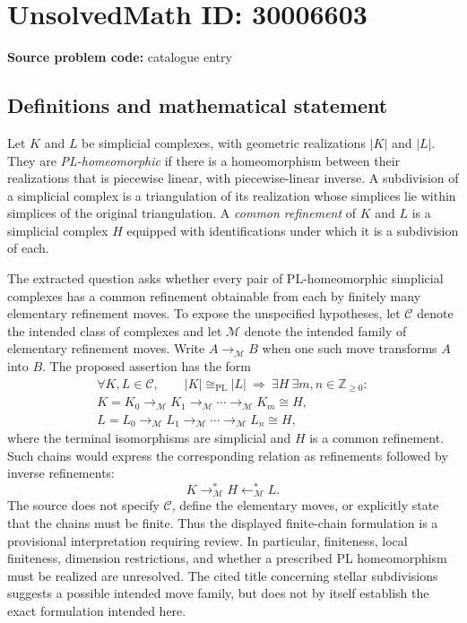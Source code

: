 \documentclass[11pt]{article}
\newcommand{\Z}{\mathbb{Z}}
\begin{document}
\section*{UnsolvedMath ID: 30006603}
\textbf{Source problem code:} catalogue entry
\subsection{Definitions and mathematical statement}
Let \(K\) and \(L\) be simplicial complexes, with geometric realizations \(|K|\) and \(|L|\). They are \emph{PL-homeomorphic} if there is a homeomorphism between their realizations that is piecewise linear, with piecewise-linear inverse. A subdivision of a simplicial complex is a triangulation of its realization whose simplices lie within simplices of the original triangulation. A \emph{common refinement} of \(K\) and \(L\) is a simplicial complex \(H\) equipped with identifications under which it is a subdivision of each.

The extracted question asks whether every pair of PL-homeomorphic simplicial complexes has a common refinement obtainable from each by finitely many elementary refinement moves. To expose the unspecified hypotheses, let \(\mathcal C\) denote the intended class of complexes and let \(\mathcal M\) denote the intended family of elementary refinement moves. Write \(A\longrightarrow_{\mathcal M}B\) when one such move transforms \(A\) into \(B\). The proposed assertion has the form
\[
\begin{gathered}
\forall K,L\in\mathcal C,\qquad
|K|\cong_{\mathrm{PL}}|L|
\ \Longrightarrow\ 
\exists H\ \exists m,n\in\Z_{\geq 0}:\\
K=K_0\longrightarrow_{\mathcal M}K_1
\longrightarrow_{\mathcal M}\cdots
\longrightarrow_{\mathcal M}K_m\cong H,\\
L=L_0\longrightarrow_{\mathcal M}L_1
\longrightarrow_{\mathcal M}\cdots
\longrightarrow_{\mathcal M}L_n\cong H,
\end{gathered}
\]
where the terminal isomorphisms are simplicial and \(H\) is a common refinement. Such chains would express the corresponding relation as refinements followed by inverse refinements:
\[
K\longrightarrow_{\mathcal M}^{*}H
\longleftarrow_{\mathcal M}^{*}L.
\]
The source does not specify \(\mathcal C\), define the elementary moves, or explicitly state that the chains must be finite. Thus the displayed finite-chain formulation is a provisional interpretation requiring review. In particular, finiteness, local finiteness, dimension restrictions, and whether a prescribed PL homeomorphism must be realized are unresolved. The cited title concerning stellar subdivisions suggests a possible intended move family, but does not by itself establish the exact formulation intended here.
\end{document}
